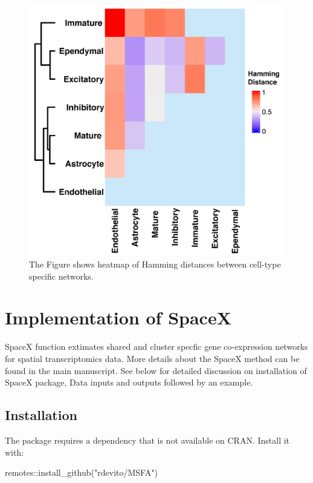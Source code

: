 \documentclass[
]{book}
\newenvironment{Shaded}{\begin{snugshade}}{\end{snugshade}}
\newcommand{\FunctionTok}[1]{\textcolor[rgb]{0.00,0.00,0.00}{#1}}
\newcommand{\NormalTok}[1]{#1}
\newcommand{\SpecialCharTok}[1]{\textcolor[rgb]{0.00,0.00,0.00}{#1}}
\newcommand{\StringTok}[1]{\textcolor[rgb]{0.31,0.60,0.02}{#1}}
\begin{document}
\begin{figure}

{\centering \includegraphics[width=0.6\linewidth]{images/Hamming_distance_Merfish} 

}

\caption{The Figure shows heatmap of Hamming distances between cell-type specific networks.}\label{fig:hammDist}
\end{figure}

\hypertarget{ImplementSpaceX}{%
\chapter{Implementation of SpaceX}\label{ImplementSpaceX}}

SpaceX function extimates shared and cluster specfic gene co-expression networks for spatial transcriptomics data. More details about the SpaceX method can be found in the main manuscript. See below for detailed discussion on installation of SpaceX package, Data inputs and outputs followed by an example.

\hypertarget{installation}{%
\section{Installation}\label{installation}}

The package requires a dependency that is not available on CRAN. Install it with:

\begin{Shaded}
\begin{Highlighting}[]
\NormalTok{remotes}\SpecialCharTok{::}\FunctionTok{install\_github}\NormalTok{(}\StringTok{"rdevito/MSFA"}\NormalTok{)}
\end{Highlighting}
\end{Shaded}
\end{document}
